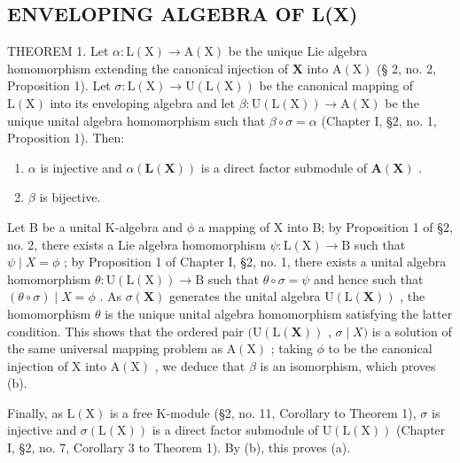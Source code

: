 \subsection{ENVELOPING ALGEBRA OF L(X)}

THEOREM 1. Let \(\alpha: \mathrm{L}(\mathrm{X}) \to \mathrm{A}(\mathrm{X})\) be the unique Lie algebra homomorphism extending the canonical injection of \(\mathbf{X}\) into \(\mathrm{A}(\mathrm{X})\) (§ 2, no. 2, Proposition 1). Let \(\sigma \colon \mathrm{L}(\mathrm{X}) \to \mathrm{U}(\mathrm{L}(\mathrm{X}))\) be the canonical mapping of \(\mathrm{L}(\mathrm{X})\) into its enveloping algebra and let \(\beta \colon \mathrm{U}(\mathrm{L}(\mathrm{X})) \to \mathrm{A}(\mathrm{X})\) be the unique unital algebra homomorphism such that \(\beta \circ \sigma = \alpha\) (Chapter I, §2, no. 1, Proposition 1). Then:

\begin{enumerate}
\def\labelenumi{(\alph{enumi})}
\item
  \(\alpha\) is injective and \(\alpha(\mathbf{L}(\mathbf{X}))\) is a direct factor submodule of \(\mathbf{A}(\mathbf{X})\) .
\item
  \(\beta\) is bijective.
\end{enumerate}

Let B be a unital K-algebra and \(\phi\) a mapping of X into B; by Proposition 1 of §2, no. 2, there exists a Lie algebra homomorphism \(\psi\colon\mathrm{L}(\mathrm{X})\to\mathrm{B}\) such that \(\psi\mid X=\phi\) ; by Proposition 1 of Chapter I, §2, no. 1, there exists a unital algebra homomorphism \(\theta\colon\mathrm{U}(\mathrm{L}(\mathrm{X}))\to\mathrm{B}\) such that \(\theta\circ\sigma=\psi\) and hence such that \((\theta\circ\sigma)\mid X=\phi\) . As \(\sigma(\mathbf{X})\) generates the unital algebra \(\mathrm{U}(\mathrm{L}(\mathbf{X}))\) , the homomorphism \(\theta\) is the unique unital algebra homomorphism satisfying the latter condition. This shows that the ordered pair \((\mathrm{U}(\mathrm{L}(\mathbf{X}))\) , \(\sigma\mid X)\) is a solution of the same universal mapping problem as \(\mathrm{A}(\mathrm{X})\) ; taking \(\phi\) to be the canonical injection of X into \(\mathrm{A}(\mathrm{X})\) , we deduce that \(\beta\) is an isomorphism, which proves (b).

Finally, as \(\mathrm{L}(\mathrm{X})\) is a free K-module (§2, no. 11, Corollary to Theorem 1), \(\sigma\) is injective and \(\sigma(\mathrm{L}(\mathrm{X}))\) is a direct factor submodule of \(\mathrm{U}(\mathrm{L}(\mathrm{X}))\) (Chapter I, §2, no. 7, Corollary 3 to Theorem 1). By (b), this proves (a).


